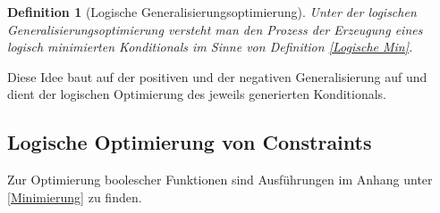 \documentclass[a4paper, 11pt]{book}
\newtheorem{Def}{Definition }[section]
\begin{document}
\begin{Def}[Logische Generalisierungsoptimierung]\label{Logische Genopt}
	Unter der logischen \\ Generalisierungsoptimierung versteht man den Prozess der Erzeugung eines logisch minimierten Konditionals im Sinne von Definition \ref{Logische Min}.
\end{Def}
Diese Idee baut auf der positiven und der negativen Generalisierung auf und dient der logischen Optimierung des jeweils generierten Konditionals.

\subsection{Logische Optimierung von Constraints} \label{LogOpt}
Zur Optimierung boolescher Funktionen sind Ausführungen im Anhang unter \ref{Minimierung} zu finden.
\end{document}
